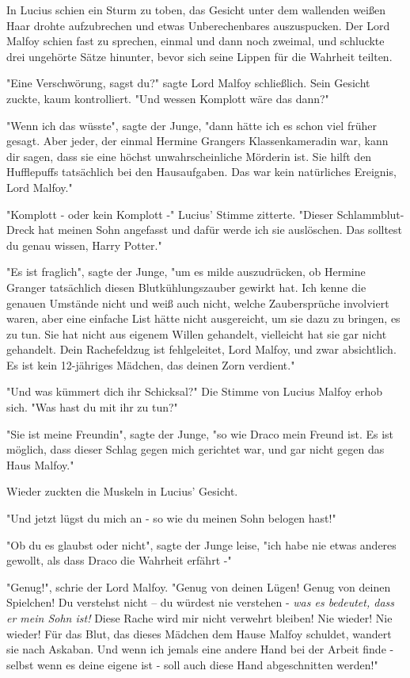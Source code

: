 {In Lucius schien ein Sturm zu toben, das Gesicht unter dem wallenden weißen Haar drohte aufzubrechen und etwas Unberechenbares auszuspucken. Der Lord Malfoy schien fast zu sprechen, einmal und dann noch zweimal, und schluckte drei ungehörte Sätze hinunter, bevor sich seine Lippen für die Wahrheit teilten.

"Eine Verschwörung, sagst du?" sagte Lord Malfoy schließlich. Sein Gesicht zuckte, kaum kontrolliert. "Und wessen Komplott wäre das dann?"

"Wenn ich das wüsste", sagte der Junge, "dann hätte ich es schon viel früher gesagt. Aber jeder, der einmal Hermine Grangers Klassenkameradin war, kann dir sagen, dass sie eine höchst unwahrscheinliche Mörderin ist. Sie hilft den Hufflepuffs tatsächlich bei den Hausaufgaben. Das war kein natürliches Ereignis, Lord Malfoy."

"Komplott - oder kein Komplott -" Lucius' Stimme zitterte. "Dieser Schlammblut-Dreck hat meinen Sohn angefasst und dafür werde ich sie auslöschen. Das solltest du genau wissen, Harry Potter."

"Es ist fraglich", sagte der Junge, "um es milde auszudrücken, ob Hermine Granger tatsächlich diesen Blutkühlungszauber gewirkt hat. Ich kenne die genauen Umstände nicht und weiß auch nicht, welche Zaubersprüche involviert waren, aber eine einfache List hätte nicht ausgereicht, um sie dazu zu bringen, es zu tun. Sie hat nicht aus eigenem Willen gehandelt, vielleicht hat sie gar nicht gehandelt. Dein Rachefeldzug ist fehlgeleitet, Lord Malfoy, und zwar absichtlich. Es ist kein 12-jähriges Mädchen, das deinen Zorn verdient."

"Und was kümmert dich ihr Schicksal?" Die Stimme von Lucius Malfoy erhob sich. "Was hast du mit ihr zu tun?"

"Sie ist meine Freundin", sagte der Junge, "so wie Draco mein Freund ist. Es ist möglich, dass dieser Schlag gegen mich gerichtet war, und gar nicht gegen das Haus Malfoy."

Wieder zuckten die Muskeln in Lucius' Gesicht.

"Und jetzt lügst du mich an - so wie du meinen Sohn belogen hast!"

"Ob du es glaubst oder nicht", sagte der Junge leise, "ich habe nie etwas anderes gewollt, als dass Draco die Wahrheit erfährt -"

"Genug!", schrie der Lord Malfoy. "Genug von deinen Lügen! Genug von deinen Spielchen! Du verstehst nicht -- du würdest nie verstehen - \emph{was es bedeutet, dass er mein Sohn ist!} Diese Rache wird mir nicht verwehrt bleiben! Nie wieder! Nie wieder! Für das Blut, das dieses Mädchen dem Hause Malfoy schuldet, wandert sie nach Askaban. Und wenn ich jemals eine andere Hand bei der Arbeit finde - selbst wenn es deine eigene ist - soll auch diese Hand abgeschnitten werden!"

}

